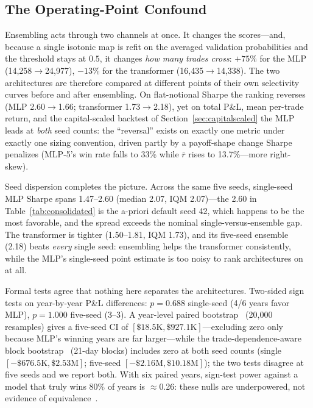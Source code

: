 \documentclass[sigconf,review,anonymous]{acmart}
\begin{document}
\subsection{The Operating-Point Confound}
\label{sec:confound}
Ensembling acts through two channels at once. It changes the scores---and, because a single isotonic map is refit on the averaged validation probabilities and the threshold stays at $0.5$, it changes \emph{how many trades cross}: $+75\%$ for the MLP (14{,}258$\to$24{,}977), $-13\%$ for the transformer (16{,}435$\to$14{,}338). The two architectures are therefore compared at different points of their own selectivity curves before and after ensembling. On flat-notional Sharpe the ranking reverses (MLP 2.60$\to$1.66; transformer 1.73$\to$2.18), yet on total P\&L, mean per-trade return, and the capital-scaled backtest of Section~\ref{sec:capitalscaled} the MLP leads at \emph{both} seed counts: the ``reversal'' exists on exactly one metric under exactly one sizing convention, driven partly by a payoff-shape change Sharpe penalizes (MLP-5's win rate falls to 33\% while $\bar r$ rises to 13.7\%---more right-skew).

Seed dispersion completes the picture. Across the same five seeds, single-seed MLP Sharpe spans 1.47--2.60 (median 2.07, IQM 2.07)---the 2.60 in Table~\ref{tab:consolidated} is the a-priori default seed 42, which happens to be the most favorable, and the spread exceeds the nominal single-versus-ensemble gap. The transformer is tighter (1.50--1.81, IQM 1.73), and its five-seed ensemble (2.18) beats \emph{every} single seed: ensembling helps the transformer consistently, while the MLP's single-seed point estimate is too noisy to rank architectures on at all.

Formal tests agree that nothing here separates the architectures. Two-sided sign tests on year-by-year P\&L differences: $p=0.688$ single-seed (4/6 years favor MLP), $p=1.000$ five-seed (3--3). A year-level paired bootstrap~\cite{efron1993bootstrap} (20{,}000 resamples) gives a five-seed CI of $[\$18.5\text{K},\$927.1\text{K}]$---excluding zero only because MLP's winning years are far larger---while the trade-dependence-aware block bootstrap~\cite{kunsch1989} (21-day blocks) includes zero at both seed counts (single $[-\$676.5\text{K},\$2.53\text{M}]$; five-seed $[-\$2.16\text{M},\$10.18\text{M}]$); the two tests disagree at five seeds and we report both. With six paired years, sign-test power against a model that truly wins 80\% of years is $\approx$0.26: these nulls are underpowered, not evidence of equivalence~\cite{bouthillier2021accounting,agarwal2021deep}.
\end{document}
